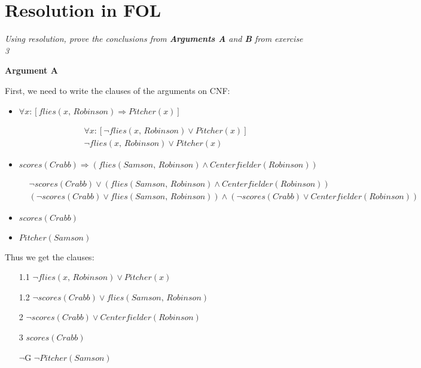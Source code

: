 \newpage

\section{Resolution in FOL}

\textit{Using resolution, prove the conclusions from \textbf{Arguments A} and \textbf{B} from exercise 3}

\textbf{Argument A} 

First, we need to write the clauses of the arguments on CNF: 

\begin{itemize}
    \item $\forall x: \left[ flies(x,\, Robinson) \Longrightarrow Pitcher(x) \right]$

    \begin{align*}
        & \forall x: \left[ \neg flies(x,\, Robinson) \lor Pitcher(x) \right] \\
        & \neg flies(x,\, Robinson) \lor Pitcher(x)
    \end{align*}

    \item $scores(Crabb) \Longrightarrow (flies(Samson,\, Robinson) \land Centerfielder(Robinson))$
    
    \begin{align*}
        & \neg scores(Crabb) \lor (flies(Samson,\, Robinson) \land Centerfielder(Robinson)) \\
        & (\neg scores(Crabb) \lor flies(Samson,\, Robinson)) \land (\neg scores(Crabb) \lor Centerfielder(Robinson)) 
    \end{align*}

    \item $scores(Crabb)$
    \item $Pitcher(Samson)$
\end{itemize}

Thus we get the clauses: 

\begin{enumerate}
    \item[1.1] $\neg flies(x,\, Robinson) \lor Pitcher(x)$
    \item[1.2] $\neg scores(Crabb) \lor flies(Samson,\, Robinson)$
    \item[2] $\neg scores(Crabb) \lor Centerfielder(Robinson)$
    \item[3] $scores(Crabb)$
    \item[$\neg$G] $\neg Pitcher(Samson)$
\end{enumerate}

